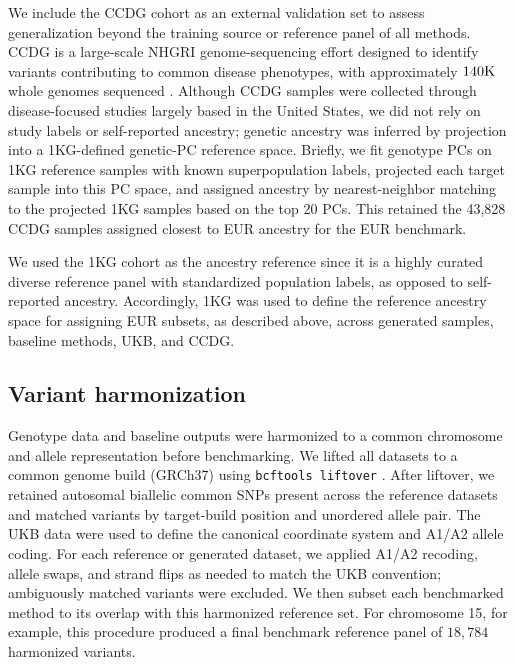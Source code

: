 \documentclass{article}
\begin{document}
We include the CCDG cohort as an external validation set to assess generalization beyond the training source or reference panel of all methods. CCDG is a large-scale NHGRI genome-sequencing effort designed to identify variants contributing to common disease phenotypes, with approximately \(140\rm{K}\) whole genomes sequenced \cite{regier2018functional}. Although CCDG samples were collected through disease-focused studies largely based in the United States, we did not rely on study labels or self-reported ancestry; 
genetic ancestry was inferred by projection into a 1KG-defined genetic-PC reference space. Briefly, we fit genotype PCs on 1KG reference samples with known superpopulation labels, projected each target sample into this PC space, and assigned ancestry by nearest-neighbor matching to the projected 1KG samples based on the top 20 PCs. This retained the 43,828 CCDG samples assigned closest to EUR ancestry for the EUR benchmark.

We used the 1KG cohort as the ancestry reference since it is a highly curated diverse reference panel with standardized population labels, as opposed to self-reported ancestry. Accordingly, 1KG was used to define the reference ancestry space for assigning EUR subsets, as described above, across generated samples, baseline methods, UKB, and CCDG. 


\subsection{Variant harmonization}
\label{app:variant-harmonization}

Genotype data and baseline outputs were harmonized to a common chromosome and allele representation before benchmarking. We lifted all datasets to a common genome build (GRCh37) using \texttt{bcftools liftover} \cite{genovese2024bcftools}. After liftover, we retained autosomal biallelic common SNPs present across the reference datasets and matched variants by target-build position and unordered allele pair. The UKB data were used to define the canonical coordinate system and A1/A2 allele coding. For each reference or generated dataset, we applied A1/A2 recoding, allele swaps, and strand flips as needed to match the UKB convention; ambiguously matched variants were excluded. We then subset each benchmarked method to its overlap with this harmonized reference set. For chromosome 15, for example, this procedure produced a final benchmark reference panel of \(18{,}784\) harmonized variants.
\end{document}
